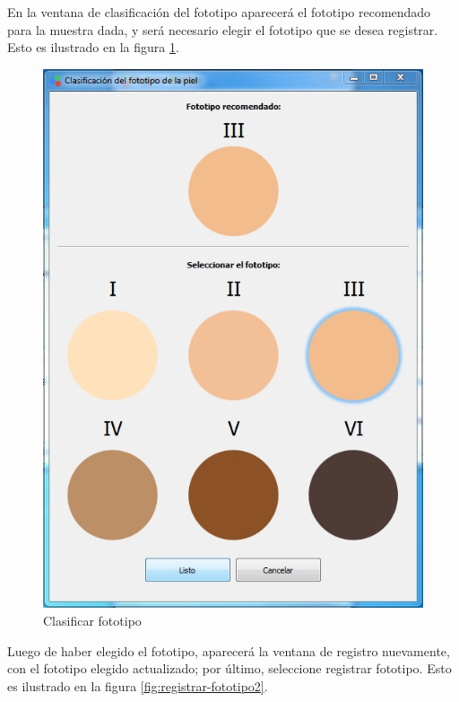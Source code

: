 		En la ventana de clasificaci\'{o}n del fototipo aparecer\'{a} el fototipo recomendado para la muestra dada, y ser\'{a} necesario elegir el fototipo que se desea registrar. Esto es ilustrado en la figura \ref{fig:clasificar-fototipo}.
\newpage
\null
\vfill
\begin{figure}[H]
  \centering
  \includegraphics[width=.8\linewidth]{./img/fototipo.jpg}
\caption[]{Clasificar fototipo\label{fig:clasificar-fototipo}}
\end{figure}
\vfill
\newpage
	Luego de haber elegido el fototipo, aparecer\'{a} la ventana de registro nuevamente, con el fototipo elegido actualizado; por \'{u}ltimo, seleccione registrar fototipo. Esto es ilustrado en la figura \ref{fig:registrar-fototipo2}.

